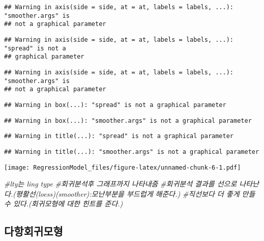 \documentclass[
]{article}
\newenvironment{Shaded}{\begin{snugshade}}{\end{snugshade}}
\newcommand{\CommentTok}[1]{\textcolor[rgb]{0.56,0.35,0.01}{\textit{#1}}}
\begin{document}
\begin{verbatim}
## Warning in axis(side = side, at = at, labels = labels, ...): "smoother.args" is
## not a graphical parameter
\end{verbatim}

\begin{verbatim}
## Warning in axis(side = side, at = at, labels = labels, ...): "spread" is not a
## graphical parameter
\end{verbatim}

\begin{verbatim}
## Warning in axis(side = side, at = at, labels = labels, ...): "smoother.args" is
## not a graphical parameter
\end{verbatim}

\begin{verbatim}
## Warning in box(...): "spread" is not a graphical parameter
\end{verbatim}

\begin{verbatim}
## Warning in box(...): "smoother.args" is not a graphical parameter
\end{verbatim}

\begin{verbatim}
## Warning in title(...): "spread" is not a graphical parameter
\end{verbatim}

\begin{verbatim}
## Warning in title(...): "smoother.args" is not a graphical parameter
\end{verbatim}

\texttt{[image: RegressionModel\_files/figure-latex/unnamed-chunk-6-1.pdf]}

\begin{Shaded}
\begin{Highlighting}[]
\CommentTok{\#lty는 ling type}
\CommentTok{\#회귀분석후 그래프까지 나타내줌}
\CommentTok{\#회귀분석 결과를 선으로 나타난다.(평활선(loess)(smoother):모난부분을 부드럽게 해준다.)}
\CommentTok{\#직선보다 더 좋게 만들 수 있다.(회귀모형에 대한 힌트를 준다.)}
\end{Highlighting}
\end{Shaded}

\hypertarget{uxb2e4uxd56duxd68cuxadc0uxbaa8uxd615}{%
\subsection{다항회귀모형}\label{uxb2e4uxd56duxd68cuxadc0uxbaa8uxd615}}
\end{document}

